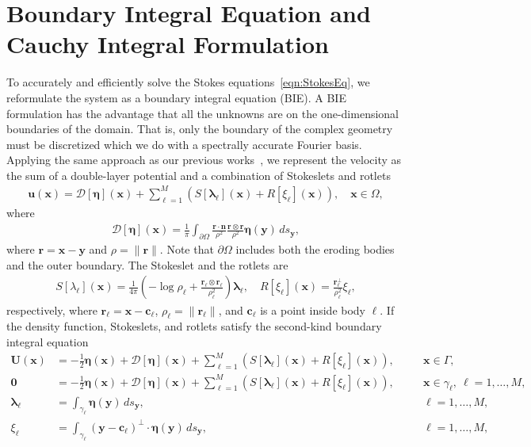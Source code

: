 \documentclass[3p]{elsarticle}
\newcommand{\bd}{{\partial}}
\newcommand{\cc}{{\mathbf{c}}}
\newcommand{\DDD}{{\boldsymbol{\mathcal D}}}
\newcommand{\eeta}{{\boldsymbol\eta}}
\newcommand{\llambda}{{\boldsymbol\lambda}}
\newcommand{\nn}{{\mathbf{n}}}
\newcommand{\rr}{{\mathbf{r}}}
\newcommand{\uu}{{\mathbf{u}}}
\newcommand{\UU}{{\mathbf{U}}}
\newcommand{\xx}{{\mathbf{x}}}
\newcommand{\yy}{{\mathbf{y}}}
\begin{document}
\section{Boundary Integral Equation and Cauchy Integral Formulation}
\label{sec:DLP}
To accurately and efficiently solve the Stokes equations~\eqref{eqn:StokesEq}, we reformulate the system as a boundary integral equation (BIE). A BIE formulation has the advantage that all the unknowns are on the one-dimensional boundaries of the domain. That is, only the boundary of the complex geometry must be discretized which we do with a spectrally accurate Fourier basis. Applying the same approach as our previous works~\cite{chiu2020viscous, quaife2018boundary}, we represent the velocity as the sum of a double-layer potential and a combination of Stokeslets and rotlets~\cite{pow-mir1987}
\begin{align}
  \uu(\xx) = \DDD[\eeta](\xx) + \sum_{\ell=1}^{M}\left(
    S[\llambda_\ell](\xx) + R[\xi_\ell](\xx)\right), 
    \quad \xx \in \Omega,
  \label{eqn:velocity}
\end{align}
where 
\begin{align}
  \DDD[\eeta](\xx) = \frac{1}{\pi}\int_{\bd\Omega} 
  \frac{\rr \cdot \nn}{\rho^2} \frac{\rr \otimes \rr}{\rho^2}
  \eeta(\yy) \, ds_\yy,
  \label{eqn:velocityDLP}
\end{align}
where $\rr = \xx - \yy$ and $\rho = \|\rr\|$. Note that $\bd\Omega$ includes both the eroding bodies and the outer boundary. The Stokeslet and the rotlets are
\begin{align}
  S[\lambda_\ell](\xx) = \frac{1}{4\pi} \left(-\log \rho_\ell +
  \frac{\rr_\ell \otimes \rr_\ell}{\rho_\ell^2} \right) \llambda_\ell,
  \quad
  R[\xi_\ell](\xx) = \frac{\rr_\ell^\perp}{\rho_\ell^2}\xi_\ell,
\end{align}
respectively, where $\rr_\ell = \xx - \cc_\ell$, $\rho_\ell = \|\rr_\ell\|$, and $\cc_\ell$ is a point inside body $\ell$. If the density function, Stokeslets, and rotlets satisfy the second-kind boundary integral equation
\begin{subequations}
  \label{eqn:FredBIE}
  \begin{alignat}{3}
    \UU(\xx) &= -\frac{1}{2}\eeta(\xx) + \DDD[\eeta](\xx) + 
      \sum_{\ell=1}^{M}\left(S[\llambda_\ell](\xx) + R[\xi_\ell](\xx)\right), 
      \quad &&\xx \in \Gamma, \\
    \mathbf{0} &= -\frac{1}{2}\eeta(\xx) + \DDD[\eeta](\xx) + 
      \sum_{\ell=1}^{M}\left(S[\llambda_\ell](\xx) + R[\xi_\ell](\xx)\right), 
      &&\xx \in \gamma_\ell, \: \ell = 1,\ldots,M, \\
    \llambda_\ell &= \int_{\gamma_\ell} \eeta(\yy) \, ds_\yy, 
      &&\ell = 1,\ldots,M, \\
    \xi_\ell &= \int_{\gamma_\ell} (\yy - \cc_\ell)^\perp \cdot 
      \eeta(\yy) \, ds_\yy, &&\ell = 1,\ldots,M,
  \end{alignat}
\end{subequations}
\end{document}
